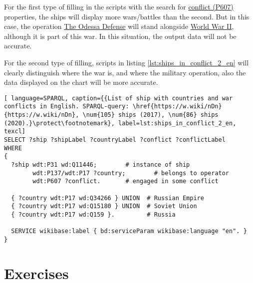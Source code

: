\label{question:ship_3}

For the first type of filling in the scripts with the search for \href{https://www.wikidata.org/wiki/Property:P607}{conflict (P607)} properties, the ships will display more wars/battles than the second. But in this case, the operation \href{https://en.wikipedia.org/wiki/Siege_of_Odessa_(1941)}{The Odessa Defense} will stand alongside \href{https://en.wikipedia.org/wiki/World_War_II}{World War II}, although it is part of this war. In this situation, the output data will not be accurate.

For the second type of filling, scripts in listing \ref{lst:ships_in_conflict_2_en} will clearly distinguish where the war is, and where the military operation, also the data displayed on the chart will be more accurate.

\begin{lstlisting}[ language=SPARQL, caption={{List of ship with countries and war conflicts in English. SPARQL-query: \href{https://w.wiki/nDn}{https://w.wiki/nDn}, \num{105} ships (2017), \num{86} ships (2020).}\protect\footnotemark}, label=lst:ships_in_conflict_2_en, texcl]
SELECT ?ship ?shipLabel ?countryLabel ?conflict ?conflictLabel
WHERE
{
  ?ship wdt:P31 wd:Q11446;        # instance of ship
        wdt:P137/wdt:P17 ?country;        # belongs to operator
        wdt:P607 ?conflict.       # engaged in some conflict
      
  { ?country wdt:P17 wd:Q34266 } UNION  # Russian Empire
  { ?country wdt:P17 wd:Q15180 } UNION  # Soviet Union
  { ?country wdt:P17 wd:Q159 }.         # Russia
      
  SERVICE wikibase:label { bd:serviceParam wikibase:language "en". }
}
\end{lstlisting}


\section{Exercises}

